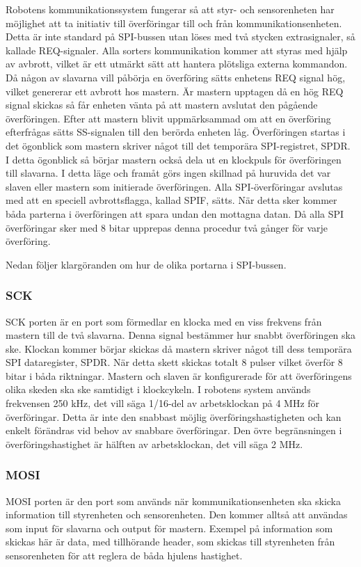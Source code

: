 Robotens kommunikationssystem fungerar så att styr- och sensorenheten har möjlighet att ta initiativ till överföringar till och från kommunikationsenheten. Detta är inte standard på SPI-bussen utan löses med två stycken extrasignaler, så kallade REQ-signaler. Alla sorters kommunikation kommer att styras med hjälp av avbrott, vilket är ett utmärkt sätt att hantera plötsliga externa kommandon. Då någon av slavarna vill påbörja en överföring sätts enhetens REQ signal hög, vilket genererar ett avbrott hos mastern. Är mastern upptagen då en hög REQ signal skickas så får enheten vänta på att mastern avslutat den pågående överföringen. Efter att mastern blivit uppmärksammad om att en överföring efterfrågas sätts SS-signalen till den berörda enheten låg. Överföringen startas i det ögonblick som mastern skriver något till det temporära SPI-registret, SPDR. I detta ögonblick så börjar mastern också dela ut en klockpuls för överföringen till slavarna. I detta läge och framåt görs ingen skillnad på huruvida det var slaven eller mastern som initierade överföringen. Alla SPI-överföringar avslutas med att en speciell avbrottsflagga, kallad SPIF, sätts. När detta sker kommer båda parterna i överföringen att spara undan den mottagna datan. Då alla SPI överföringar sker med 8 bitar upprepas denna procedur två gånger för varje överföring.

Nedan följer klargöranden om hur de olika portarna i SPI-bussen. 

\subsubsection{SCK}

SCK porten är en port som förmedlar en klocka med en viss frekvens från mastern till de två slavarna. Denna signal bestämmer hur snabbt överföringen ska ske. Klockan kommer börjar skickas då mastern skriver något till dess temporära SPI dataregister, SPDR. När detta skett skickas totalt 8 pulser vilket överför 8 bitar i båda riktningar. Mastern och slaven är konfigurerade för att överföringens olika skeden ska ske samtidigt i klockcykeln. I robotens system används frekvensen 250 kHz, det vill säga 1/16-del av arbetsklockan på 4 MHz för överföringar. Detta är inte den snabbast möjlig överföringshastigheten och kan enkelt förändras vid behov av snabbare överföringar. Den övre begränsningen i överföringshastighet är hälften av arbetsklockan, det vill säga 2 MHz.


\subsubsection{MOSI}
MOSI porten är den port som används när kommunikationsenheten ska skicka 
information till styrenheten och sensorenheten. Den kommer alltså att användas som
input för slavarna och output för mastern. Exempel på information som skickas här är data, med tillhörande header, som skickas till styrenheten från sensorenheten för att reglera de båda hjulens hastighet.

